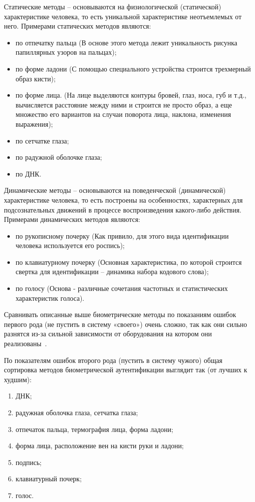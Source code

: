Статические методы -- основываются на физиологической (статической) характеристике человека, то есть уникальной характеристике неотъемлемых от него.
Примерами статических методов являются:
\begin{itemize}
  \item по отпечатку пальца (В основе этого метода лежит уникальность рисунка папиллярных узоров на пальцах);
  \item по форме ладони (С помощью специального устройства строится трехмерный образ кисти);
  \item по форме лица. (На лице выделяются контуры бровей, глаз, носа, губ и т.д., вычисляется расстояние между ними и строится не просто образ, а еще множество его вариантов на случаи поворота лица, наклона, изменения выражения);
  \item по сетчатке глаза;
  \item по радужной оболочке глаза;
  \item по ДНК.
\end{itemize}

Динамические методы -- основываются на поведенческой (динамической) характеристике человека, то есть построены на особенностях, характерных для подсознательных движений в процессе воспроизведения какого-либо действия.
Примерами динамических методов являются:
\begin{itemize}
  \item по рукописному почерку (Как привило, для этого вида идентификации человека используется его роспись);
  \item по клавиатурному почерку (Основная характеристика, по которой строится свертка для идентификации – динамика набора кодового слова);
  \item по голосу (Основа - различные сочетания частотных и статистических характеристик голоса).
\end{itemize}
Сравнивать описанные выше биометрические методы по показаниям ошибок первого рода (не пустить в систему «своего») очень сложно, так как они сильно разнятся из-за сильной зависимости от оборудования на котором они реализованы~\cite{lorette_plamondon}.

По показателям ошибок второго рода (пустить в систему чужого) общая сортировка методов биометрической аутентификации выглядит так (от лучших к худшим):
\begin{enumerate}
  \item ДНК;
  \item радужная оболочка глаза, сетчатка глаза;
  \item отпечаток пальца, термография лица, форма ладони;
  \item форма лица, расположение вен на кисти руки и ладони;
  \item подпись;
  \item клавиатурный почерк;
  \item голос.
\end{enumerate}

